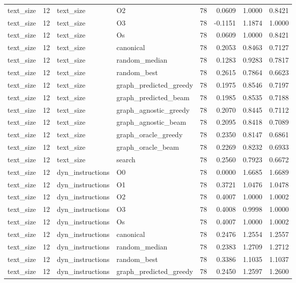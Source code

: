 \begin{table}[t]
\begin{tabular}{lrllrrrr}
text\_size & 12 & text\_size & O2 & 78 & 0.0609 & 1.0000 & 0.8421 \\
text\_size & 12 & text\_size & O3 & 78 & -0.1151 & 1.1874 & 1.0000 \\
text\_size & 12 & text\_size & Os & 78 & 0.0609 & 1.0000 & 0.8421 \\
text\_size & 12 & text\_size & canonical & 78 & 0.2053 & 0.8463 & 0.7127 \\
text\_size & 12 & text\_size & random\_median & 78 & 0.1283 & 0.9283 & 0.7817 \\
text\_size & 12 & text\_size & random\_best & 78 & 0.2615 & 0.7864 & 0.6623 \\
text\_size & 12 & text\_size & graph\_predicted\_greedy & 78 & 0.1975 & 0.8546 & 0.7197 \\
text\_size & 12 & text\_size & graph\_predicted\_beam & 78 & 0.1985 & 0.8535 & 0.7188 \\
text\_size & 12 & text\_size & graph\_agnostic\_greedy & 78 & 0.2070 & 0.8445 & 0.7112 \\
text\_size & 12 & text\_size & graph\_agnostic\_beam & 78 & 0.2095 & 0.8418 & 0.7089 \\
text\_size & 12 & text\_size & graph\_oracle\_greedy & 78 & 0.2350 & 0.8147 & 0.6861 \\
text\_size & 12 & text\_size & graph\_oracle\_beam & 78 & 0.2269 & 0.8232 & 0.6933 \\
text\_size & 12 & text\_size & search & 78 & 0.2560 & 0.7923 & 0.6672 \\
text\_size & 12 & dyn\_instructions & O0 & 78 & 0.0000 & 1.6685 & 1.6689 \\
text\_size & 12 & dyn\_instructions & O1 & 78 & 0.3721 & 1.0476 & 1.0478 \\
text\_size & 12 & dyn\_instructions & O2 & 78 & 0.4007 & 1.0000 & 1.0002 \\
text\_size & 12 & dyn\_instructions & O3 & 78 & 0.4008 & 0.9998 & 1.0000 \\
text\_size & 12 & dyn\_instructions & Os & 78 & 0.4007 & 1.0000 & 1.0002 \\
text\_size & 12 & dyn\_instructions & canonical & 78 & 0.2476 & 1.2554 & 1.2557 \\
text\_size & 12 & dyn\_instructions & random\_median & 78 & 0.2383 & 1.2709 & 1.2712 \\
text\_size & 12 & dyn\_instructions & random\_best & 78 & 0.3386 & 1.1035 & 1.1037 \\
text\_size & 12 & dyn\_instructions & graph\_predicted\_greedy & 78 & 0.2450 & 1.2597 & 1.2600 \\

\end{tabular}
\end{table}
